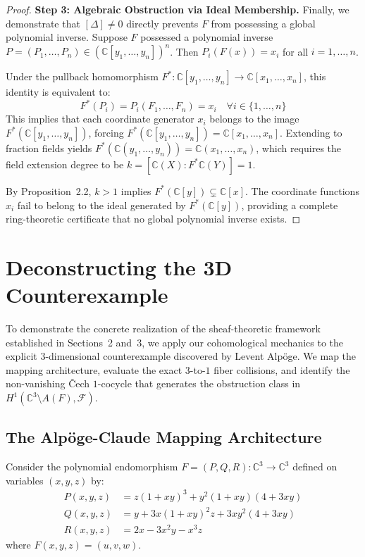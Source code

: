\documentclass[11pt,reqno]{amsart}
\theoremstyle{definition}
\begin{document}
\begin{proof}
\textbf{Step 3: Algebraic Obstruction via Ideal Membership.}
Finally, we demonstrate that $[\Delta] \neq 0$ directly prevents $F$ from possessing a global polynomial inverse. Suppose $F$ possessed a polynomial inverse $P = (P_1, \dots, P_n) \in (\mathbb{C}[y_1, \dots, y_n])^n$. Then $P_i(F(x)) = x_i$ for all $i = 1, \dots, n$.

Under the pullback homomorphism $F^*: \mathbb{C}[y_1, \dots, y_n] \to \mathbb{C}[x_1, \dots, x_n]$, this identity is equivalent to:
$$F^*(P_i) = P_i(F_1, \dots, F_n) = x_i \quad \forall i \in \{1, \dots, n\}$$
This implies that each coordinate generator $x_i$ belongs to the image $F^*(\mathbb{C}[y_1, \dots, y_n])$, forcing $F^*(\mathbb{C}[y_1, \dots, y_n]) = \mathbb{C}[x_1, \dots, x_n]$. Extending to fraction fields yields $F^*(\mathbb{C}(y_1, \dots, y_n)) = \mathbb{C}(x_1, \dots, x_n)$, which requires the field extension degree to be $k = [\mathbb{C}(X) : F^*\mathbb{C}(Y)] = 1$.

By Proposition~2.2, $k > 1$ implies $F^*(\mathbb{C}[y]) \subsetneq \mathbb{C}[x]$. The coordinate functions $x_i$ fail to belong to the ideal generated by $F^*(\mathbb{C}[y])$, providing a complete ring-theoretic certificate that no global polynomial inverse exists.
\end{proof}

\section{Deconstructing the 3D Counterexample}

To demonstrate the concrete realization of the sheaf-theoretic framework established in Sections~2 and~3, we apply our cohomological mechanics to the explicit $3$-dimensional counterexample discovered by Levent Alp\"oge. We map the mapping architecture, evaluate the exact $3$-to-$1$ fiber collisions, and identify the non-vanishing \v{C}ech $1$-cocycle that generates the obstruction class in $H^1(\mathbb{C}^3 \setminus A(F), \mathcal{F})$.

\subsection{The Alp\"oge-Claude Mapping Architecture}\cite{Alpoge2026}
Consider the polynomial endomorphism $F = (P, Q, R): \mathbb{C}^3 \to \mathbb{C}^3$ defined on variables $(x, y, z)$ by:
\begin{align*}
P(x,y,z) &= z(1+xy)^3 + y^2(1+xy)(4+3xy) \\
Q(x,y,z) &= y + 3x(1+xy)^2z + 3xy^2(4+3xy) \\
R(x,y,z) &= 2x - 3x^2y - x^3z
\end{align*}
where $F(x,y,z) = (u,v,w)$.
\end{document}
